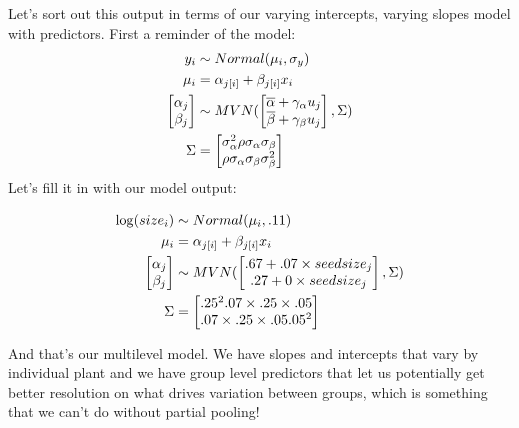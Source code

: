 \documentclass[
  letterpaper,
  DIV=11,
  numbers=noendperiod]{scrartcl}
\begin{document}
Let's sort out this output in terms of our varying intercepts, varying
slopes model with predictors. First a reminder of the model: \[
\begin{align*}
y_i &\sim Normal(\mu_i, \sigma_y)\\
\mu_i &= \alpha_{j[i]} + \beta_{j[i]} x_i\\
\begin{bmatrix} \alpha_j \\ \beta_j \end{bmatrix} &\sim MVN(\begin{bmatrix} \overline{\alpha} + \gamma_{\alpha} u_j \\ \overline{\beta} + \gamma_{\beta} u_j\end{bmatrix}, \Sigma)\\
\Sigma &= \begin{bmatrix} \sigma_{\alpha}^2 \space \space \rho\sigma_{\alpha}\sigma_{\beta} \\ \rho\sigma_{\alpha}\sigma_{\beta} \space  \space \sigma_{\beta}^2\end{bmatrix}
\end{align*}
\] Let's fill it in with our model output:

\[
\begin{align*}
\log(size_i) &\sim Normal(\space\mu_i,\space .11)\\
\mu_i &= \alpha_{j[i]} + \beta_{j[i]} x_i\\
\begin{bmatrix} \alpha_j \\ \beta_j \end{bmatrix} &\sim MVN(\begin{bmatrix} .67 + .07 \times seedsize_j \\ .27 + 0\times seedsize_j\end{bmatrix}, \Sigma)\\
\Sigma &= \begin{bmatrix} .25^2 \space \space \space .07\times .25\times .05 \\ .07\times .25\times .05 \space \space  \space .05^2\end{bmatrix}
\end{align*}
\]

And that's our multilevel model. We have slopes and intercepts that vary
by individual plant and we have group level predictors that let us
potentially get better resolution on what drives variation between
groups, which is something that we can't do without partial pooling!
\end{document}
